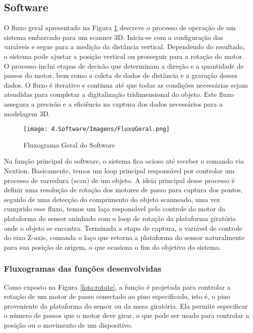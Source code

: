 \subsection{Software}

O fluxo geral apresentado na Figura  \ref{foto:fluxogeral} descreve o processo de operação de um sistema embarcado para um scanner 3D. Inicia-se com a configuração das variáveis e segue para a medição da distância vertical. Dependendo do resultado, o sistema pode ajustar a posição vertical ou prosseguir para a rotação do motor. O processo inclui etapas de decisão que determinam a direção e a quantidade de passos do motor, bem como a coleta de dados de distância e a gravação desses dados. O fluxo é iterativo e continua até que todas as condições necessárias sejam atendidas para completar a digitalização tridimensional do objeto. Este fluxo assegura a precisão e a eficiência na captura dos dados necessários para a modelagem 3D.

\begin{figure}[H]
\captionsetup{width=0.6\textwidth}%
\caption{Fluxograma Geral do Software}%
\label{foto:fluxogeral}%
\texttt{[image: 4.Software/Imagens/FluxoGeral.png]}%
\end{figure}

Na função principal do software, o sistema fica ocioso até receber o comando via Nextion. Basicamente, temos um loop principal responsável por controlar um processo de varredura (scan) de um objeto. A ideia principal desse processo é definir uma resolução de rotação dos motores de passo para captura dos pontos, seguido de uma detecção do comprimento do objeto scanneado, uma vez cumprido esse fluxo, temos um laço responsável pelo controle do motor da plataforma do sensor aninhado com o loop de rotação da plataforma giratória onde o objeto se encontra. Terminada a etapa de captura, a variável de controle do eixo Z-axis, comanda o laço que retorna a plataforma do sensor naturalmente para sua posição de origem, o que ocasiona o fim do objetivo do sistema. 


\subsubsection{Fluxogramas das funções desenvolvidas}

Como exposto na Figura \ref{foto:rotate}, a função é projetada para controlar a rotação de um motor de passo conectado ao pino especificado, isto é, o pino proveniente da plataforma do sensor ou da mesa giratória. Ela permite especificar o número de passos que o motor deve girar, o que pode ser usado para controlar a posição ou o movimento de um dispositivo.


